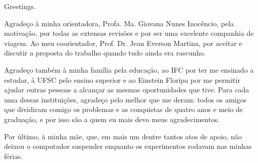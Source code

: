 
\begin{agradecimentos}

\lang
{
    Greetings.
}
{
    Agradeço à minha orientadora, Profa. Ma. Giovana Nunes Inocêncio, pela motivação, por todas as extensas revisões e por ser uma excelente companhia de viagem. Ao meu coorientador, Prof. Dr. Jean Everson Martina, por aceitar e discutir a proposta do trabalho quando tudo ainda era rascunho.

    Agradeço também à minha família pela educação, ao IFC por ter me ensinado a estudar, à UFSC pelo ensino superior e ao Einstein Floripa por me permitir ajudar outras pessoas a alcançar as mesmas oportunidades que tive. Para cada uma dessas instituições, agradeço pelo melhor que me deram: todos os amigos que dividiram comigo os problemas e as conquistas de quatro anos e meio de graduação, e por isso são a quem eu mais devo meus agradecimentos.

    Por último, à minha mãe, que, em mais um dentre tantos atos de apoio, não deixou o computador suspender enquanto os experimentos rodavam nas minhas férias.
}

\end{agradecimentos}

